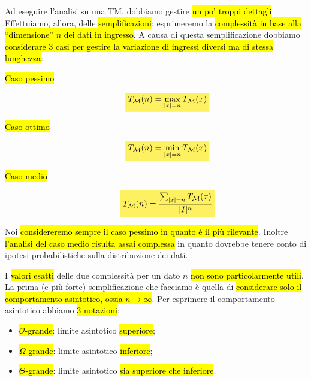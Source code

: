 \documentclass[a4paper,11pt,oneside]{article}
\theoremstyle{plain}
\theoremstyle{definition}
\theoremstyle{remark}
\newcommand{\mhl}[1]{\colorbox{hlcolor}{$\displaystyle #1$}}
\begin{document}
Ad eseguire l'analisi su una TM, dobbiamo gestire \hl{un po' troppi dettagli}.
Effettuiamo, allora, delle \hl{semplificazioni}: esprimeremo la \hl{complessità
in base alla ``dimensione'' $n$ dei dati in ingresso}. A causa di questa
semplificazione dobbiamo \hl{considerare 3 casi per gestire la variazione di
ingressi diversi ma di stessa lunghezza}:

\begin{description}
  \item[\hl{Caso pessimo}]
    \begin{equation}
      \mhl{
        T_\mathcal{M}(n) = \max_{|x|=n} T_\mathcal{M}(x)\label{def:caso-pessimo}
      }
    \end{equation}

  \item[\hl{Caso ottimo}]
    \begin{equation}
      \mhl{
        T_\mathcal{M}(n) = \min_{|x|=n} T_\mathcal{M}(x)\label{def:caso-ottimo}
      }
    \end{equation}

  \item[\hl{Caso medio}]
    \begin{equation}
      \mhl{
        T_\mathcal{M}(n) = \frac{\sum_{|x|=n} T_\mathcal{M}(x)}{|I|^n}\label{def:caso-medio}
      }
    \end{equation}
\end{description}

Noi \hl{considereremo sempre il caso pessimo in quanto è il più rilevante}.
Inoltre \hl{l'analisi del caso medio risulta assai complessa} in quanto dovrebbe
tenere conto di ipotesi probabilistiche sulla distribuzione dei dati.

I \hl{valori esatti} delle due complessità per un dato $n$ \hl{non sono
particolarmente utili}. La prima (e più forte) semplificazione che facciamo è
quella di \hl{considerare solo il comportamento asintotico, ossia $n \to
\infty$}. Per esprimere il comportamento asintotico abbiamo \hl{3 notazioni}:

\begin{itemize}
  \item \hl{$\mathcal{O}$-grande}: limite asintotico \hl{superiore};
  \item \hl{$\Omega$-grande}: limite asintotico \hl{inferiore};
  \item \hl{$\Theta$-grande}: limite asintotico \hl{sia superiore che
    inferiore}.
\end{itemize}
\end{document}
